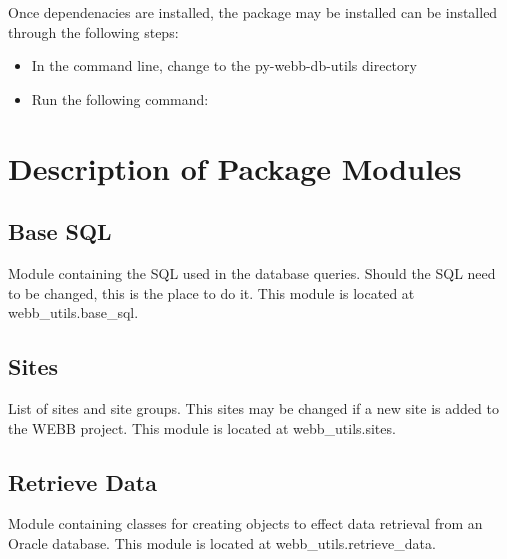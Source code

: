 \documentclass[letterpaper,10pt,english]{sphinxmanual}
\begin{document}
Once dependenacies are installed, the package may be installed can be installed through the following steps:
\begin{itemize}
\item {} 
In the command line, change to the py-webb-db-utils directory

\item {} 
Run the following command: 

\end{itemize}


\chapter{Description of Package Modules}
\label{modules::doc}\label{modules:description-of-package-modules}

\section{Base SQL}
\label{modules:base-sql}
Module containing the SQL used in the database queries.
Should the SQL need to be changed, this is the place to
do it. This module is located at webb\_utils.base\_sql.


\section{Sites}
\label{modules:sites}
List of sites and site groups. This sites may be changed
if a new site is added to the WEBB project. This module is
located at webb\_utils.sites.


\section{Retrieve Data}
\label{modules:retrieve-data}
Module containing classes for creating objects to
effect data retrieval from an Oracle database. This
module is located at webb\_utils.retrieve\_data.
\end{document}

